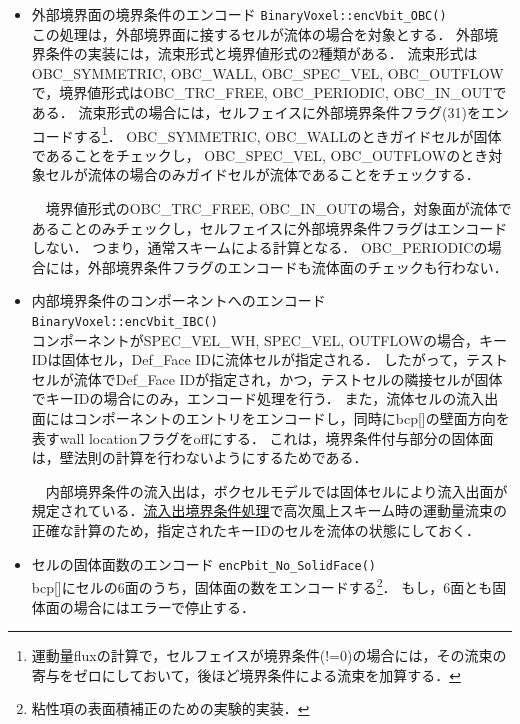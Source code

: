 \begin{enumerate}
\begin{itemize}
\item 外部境界面の境界条件のエンコード \verb|BinaryVoxel::encVbit_OBC()|\\
この処理は，外部境界面に接するセルが流体の場合を対象とする．
外部境界条件の実装には，流束形式と境界値形式の2種類がある．
流束形式はOBC\_SYMMETRIC, OBC\_WALL, OBC\_SPEC\_VEL, OBC\_OUTFLOWで，境界値形式はOBC\_TRC\_FREE, OBC\_PERIODIC, OBC\_IN\_OUTである．
流束形式の場合には，セルフェイスに外部境界条件フラグ(31)をエンコードする\footnote{運動量fluxの計算で，セルフェイスが境界条件(!=0)の場合には，その流束の寄与をゼロにしておいて，後ほど境界条件による流束を加算する．}．
OBC\_SYMMETRIC, OBC\_WALLのときガイドセルが固体であることをチェックし，
OBC\_SPEC\_VEL, OBC\_OUTFLOWのとき対象セルが流体の場合のみガイドセルが流体であることをチェックする．

　境界値形式のOBC\_TRC\_FREE, OBC\_IN\_OUTの場合，対象面が流体であることのみチェックし，セルフェイスに外部境界条件フラグはエンコードしない．
つまり，通常スキームによる計算となる．
OBC\_PERIODICの場合には，外部境界条件フラグのエンコードも流体面のチェックも行わない．
\vspace{2mm}

\item 内部境界条件のコンポーネントへのエンコード \verb|BinaryVoxel::encVbit_IBC()|\\
コンポーネントがSPEC\_VEL\_WH, SPEC\_VEL, OUTFLOWの場合，キーIDは固体セル，Def\_Face IDに流体セルが指定される．
したがって，テストセルが流体でDef\_Face IDが指定され，かつ，テストセルの隣接セルが固体でキーIDの場合にのみ，エンコード処理を行う．
また，流体セルの流入出面にはコンポーネントのエントリをエンコードし，同時にbcp[]の壁面方向を表すwall locationフラグをoffにする．
これは，境界条件付与部分の固体面は，壁法則の計算を行わないようにするためである．

　内部境界条件の流入出は，ボクセルモデルでは固体セルにより流入出面が規定されている．\hyperlink{tgt:inflow}{流入出境界条件処理}で高次風上スキーム時の運動量流束の正確な計算のため，指定されたキーIDのセルを流体の状態にしておく．
\vspace{2mm}

\item セルの固体面数のエンコード \verb|encPbit_No_SolidFace()|\\
bcp[]にセルの6面のうち，固体面の数をエンコードする\footnote{粘性項の表面積補正のための実験的実装．}．
もし，6面とも固体面の場合にはエラーで停止する．

\end{itemize}


\end{enumerate}
